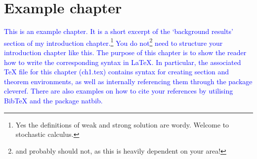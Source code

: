 \chapter[Example chapter]{Example chapter}
\label{ch:examplechapter}
\textcolor{blue}{This is an example chapter. It is a short excerpt of the `background results' section of my introduction chapter.\footnote{Yes the definitions of weak and strong solution are wordy. Welcome to stochastic calculus.} You do not\footnote{and probably should not, as this is heavily dependent on your area!} need to structure your introduction chapter like this. The purpose of this chapter is to show the reader how to write the corresponding syntax in LaTeX. In particular, the associated TeX file for this chapter (ch1.tex) contains syntax for creating section and theorem environments, as well as internally referencing them through the package cleveref. There are also examples on how to cite your references by utilising BibTeX and the package natbib.}
